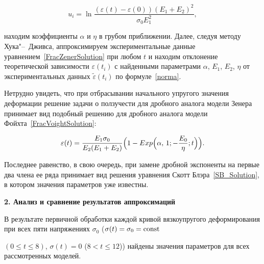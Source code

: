 \documentclass[11pt,a4paper,twoside]{article}
\begin{document}
$$


u_{i}=\ln \frac{(\varepsilon(t)-\varepsilon(0))(E_{1}+E_{2})^{2}}{\sigma_{0}E_{1}^{2}},


$$ 


находим коэффициенты $\alpha$ и $\eta$ в грубом приближении. Далее, следуя методу Хука"--~Дживса, аппроксимируем экспериментальные данные уравнением~\eqref{FracZenerSolution} при любом $t$ и находим отклонение теоретической зависимости $\varepsilon(t_{i})$ с найденными параметрами $\alpha$, $E_{1}$, $E_{2}$, $\eta$ от экспериментальных данных $\tilde{\varepsilon}(t_{i})$ по формуле~\eqref{norma}. 





Нетрудно увидеть, что при отбрасывании начального упругого значения деформации решение задачи о ползучести для дробного аналога модели Зенера принимает вид подобный решению для дробного аналога модели Фойхта~\eqref{FracVoightSolution}:


\begin{equation*}




\varepsilon(t)=\frac{E_{1}\sigma_{0}}{E_{2}(E_{1}+E_{2})}\Bigl(1-Exp\Bigl(\alpha,\,1;-\frac{E_{0}}{\eta};t\Bigl)\Bigr).


\end{equation*}  


Последнее равенство, в свою очередь, при замене дробной экспоненты на первые два члена ее ряда принимает вид решения уравнения Скотт Блэра~\eqref{SB_Solution}, в котором значения параметров уже известны.





\smallskip





{\bf2. Анализ и сравнение результатов аппроксимаций} 





В результате первичной обработки каждой кривой вязкоупругого деформирования при всех пяти напряжениях $\sigma_{0}$ ($\sigma(t)=\sigma_{0}=\rm const$ 


$(0\leq t \leq 8)$, $\sigma(t)=0$ ($8<t\leq 12$)) найдены значения параметров для всех рассмотренных моделей. 
\end{document}
